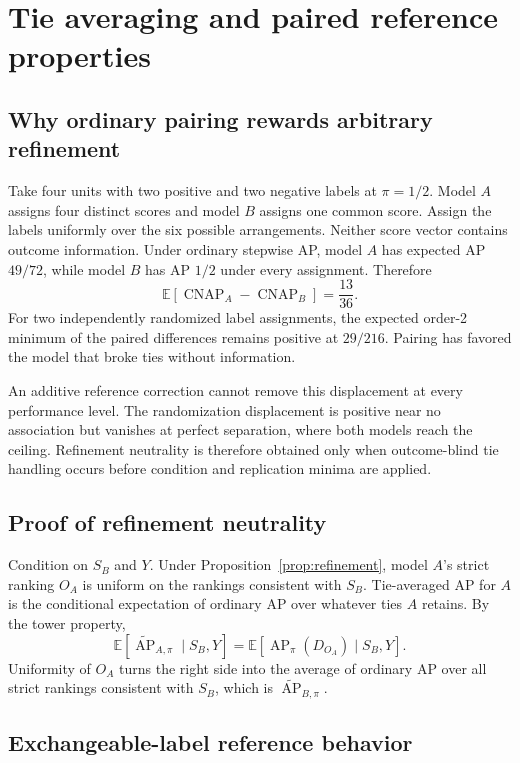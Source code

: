 \documentclass[11pt]{article}
\newcommand{\AP}{\operatorname{AP}}
\newcommand{\CNAP}{\operatorname{CNAP}}
\newcommand{\E}{\mathbb{E}}
\newcommand{\APta}{\widetilde{\AP}}
\theoremstyle{remark}
\begin{document}
\section{Tie averaging and paired reference properties}
\label{app:paired-proofs}

\subsection{Why ordinary pairing rewards arbitrary refinement}

Take four units with two positive and two negative labels at $\pi=1/2$.
Model $A$ assigns four distinct scores and model $B$ assigns one common score.
Assign the labels uniformly over the six possible arrangements. Neither score
vector contains outcome information. Under ordinary stepwise AP, model $A$ has
expected AP $49/72$, while model $B$ has AP $1/2$ under every assignment.
Therefore
\[
\E[\CNAP_A-\CNAP_B]=\frac{13}{36}.
\]
For two independently randomized label assignments, the expected order-2
minimum of the paired differences remains positive at $29/216$. Pairing has
favored the model that broke ties without information.

An additive reference correction cannot remove this displacement at every
performance level. The randomization displacement is positive near no
association but vanishes at perfect separation, where both models reach the
ceiling. Refinement neutrality is therefore obtained only when outcome-blind
tie handling occurs before condition and replication minima are applied.

\subsection{Proof of refinement neutrality}
\label{app:proof-refinement}

Condition on $S_B$ and $Y$. Under Proposition~\ref{prop:refinement}, model
$A$'s strict ranking $O_A$ is uniform on the rankings consistent with $S_B$.
Tie-averaged AP for $A$ is the conditional expectation of ordinary AP over
whatever ties $A$ retains. By the tower property,
\[
\E[\APta_{A,\pi}\mid S_B,Y]
=
\E[\AP_\pi(D_{O_A})\mid S_B,Y].
\]
Uniformity of $O_A$ turns the right side into the average of ordinary AP over
all strict rankings consistent with $S_B$, which is $\APta_{B,\pi}$.

\subsection{Exchangeable-label reference behavior}
\end{document}
